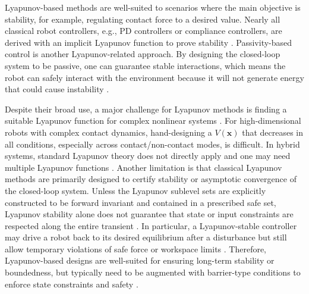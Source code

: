 \documentclass[Afour,sageh,times]{template/sagej}
\begin{document}
Lyapunov-based methods are well-suited to scenarios where the main objective is stability, for example, regulating contact force to a desired value. Nearly all classical robot controllers, e.g., PD controllers or compliance controllers, are derived with an implicit Lyapunov function to prove stability \citep{16, 2, 32}. Passivity-based control is another Lyapunov-related approach. By designing the closed-loop system to be passive, one can guarantee stable interactions, which means the robot can safely interact with the environment because it will not generate energy that could cause instability \citep{van2014port, forni2018differential, hill2022dissipativity, 35, 75}.

Despite their broad use, a major challenge for Lyapunov methods is finding a suitable Lyapunov function for complex nonlinear systems \citep{khalil2002nonlinear}. For high-dimensional robots with complex contact dynamics, hand-designing a $V(\boldsymbol{x})$ that decreases in all conditions, especially across contact/non-contact modes, is difficult. In hybrid systems, standard Lyapunov theory does not directly apply and one may need multiple Lyapunov functions \citep{branicky2002multiple, giesl2015review, manchester2017control}. Another limitation is that classical Lyapunov methods are primarily designed to certify stability or asymptotic convergence of the closed-loop system. Unless the Lyapunov sublevel sets are explicitly constructed to be forward invariant and contained in a prescribed safe set, Lyapunov stability alone does not guarantee that state or input constraints are respected along the entire transient \citep{romdlony2016stabilization, li2023survey}. In particular, a Lyapunov-stable controller may drive a robot back to its desired equilibrium after a disturbance but still allow temporary violations of safe force or workspace limits \citep{manjunath2021safe, wu2015safety}. Therefore, Lyapunov-based designs are well-suited for ensuring long-term stability or boundedness, but typically need to be augmented with barrier-type conditions to enforce state constraints and safety \citep{ames2019cbf, blanchini1999set}.
\end{document}
